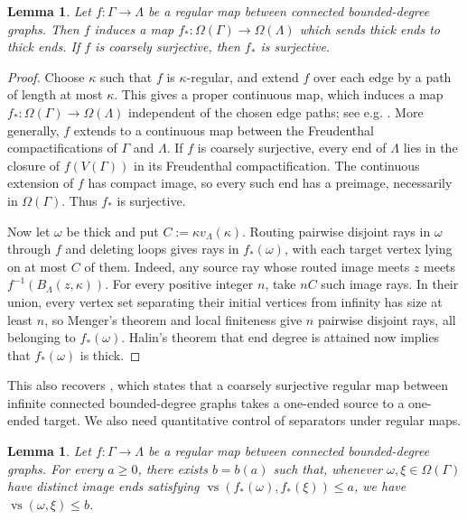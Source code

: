 \documentclass[10pt,a4paper]{amsart}
\newtheorem{lemma}[theorem]{Lemma}
\theoremstyle{definition}
\begin{document}
\begin{lemma}\label{lem:regular-map-on-ends}
Let $f:\Gamma\to\Lambda$ be a regular map between connected bounded-degree graphs. Then $f$ induces a map $f_*:\Omega(\Gamma)\to\Omega(\Lambda)$ which sends thick ends to thick ends. If $f$ is coarsely surjective, then $f_*$ is surjective.
\end{lemma}

\begin{proof}
Choose $\kappa$ such that $f$ is $\kappa$-regular, and extend $f$ over each edge by a path of length at most $\kappa$. This gives a proper continuous map, which induces a map $f_*:\Omega(\Gamma)\to\Omega(\Lambda)$ independent of the chosen edge paths; see e.g. \cite[Prop.~I.9.11]{baues2001infinite}. More generally, $f$ extends to a continuous map between the Freudenthal compactifications of $\Gamma$ and $\Lambda$. 
If $f$ is coarsely surjective, every end of $\Lambda$ lies in the closure of $f(V(\Gamma))$ in its Freudenthal compactification. The continuous extension of $f$ has compact image, so every such end has a preimage, necessarily in $\Omega(\Gamma)$. Thus $f_*$ is surjective.

Now let $\omega$ be thick and put $C:=\kappa v_\Lambda(\kappa)$. Routing pairwise disjoint rays in $\omega$ through $f$ and deleting loops gives rays in $f_*(\omega)$, with each target vertex lying on at most $C$ of them. Indeed, any source ray whose routed image meets $z$ meets $f^{-1}(B_\Lambda(z,\kappa))$. For every positive integer $n$, take $nC$ such image rays. In their union, every vertex set separating their initial vertices from infinity has size at least $n$, so Menger's theorem and local finiteness give $n$ pairwise disjoint rays, all belonging to $f_*(\omega)$. Halin's theorem that end degree is attained \cite[p.~241]{diestel2025graph} now implies that $f_*(\omega)$ is thick.
\end{proof}

This also recovers \cite[Lem.~3.9]{mackay2026almost}, which states that a coarsely surjective regular map between infinite connected bounded-degree graphs takes a one-ended source to a one-ended target.
We also need quantitative control of separators under regular maps.

\begin{lemma}\label{lem:regular-end-separators}
Let $f:\Gamma\to\Lambda$ be a regular map between connected bounded-degree graphs.
For every $a\geq0$, there exists $b=b(a)$ such that, whenever $\omega,\xi\in\Omega(\Gamma)$ have distinct image ends satisfying $\operatorname{vs}(f_*(\omega),f_*(\xi))\leq a$, we have $\operatorname{vs}(\omega,\xi)\leq b$.
\end{lemma}
\end{document}
